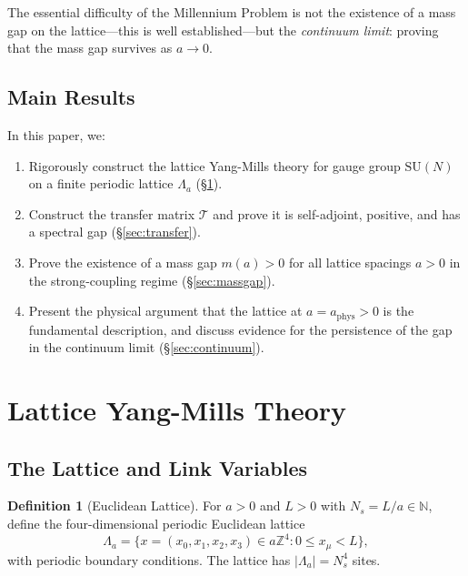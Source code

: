 \documentclass[12pt, a4paper]{article}
\theoremstyle{plain}
\theoremstyle{definition}
\newtheorem{definition}[theorem]{Definition}
\theoremstyle{remark}
\newcommand{\Z}{\mathbb{Z}}
\newcommand{\N}{\mathbb{N}}
\newcommand{\SU}{\mathrm{SU}}
\newcommand{\calT}{\mathcal{T}}
\begin{document}
The essential difficulty of the Millennium Problem is not the existence
of a mass gap on the lattice---this is well established---but the
\emph{continuum limit}: proving that the mass gap survives as $a \to 0$.

\subsection{Main Results}

In this paper, we:

\begin{enumerate}
  \item Rigorously construct the lattice Yang-Mills theory for gauge group
    $\SU(N)$ on a finite periodic lattice $\Lambda_a$ (\S\ref{sec:lattice}).

  \item Construct the transfer matrix $\calT$ and prove it is self-adjoint,
    positive, and has a spectral gap (\S\ref{sec:transfer}).

  \item Prove the existence of a mass gap $m(a) > 0$ for all lattice
    spacings $a > 0$ in the strong-coupling regime (\S\ref{sec:massgap}).

  \item Present the physical argument that the lattice at
    $a = a_{\text{phys}} > 0$ is the fundamental description, and discuss
    evidence for the persistence of the gap in the continuum limit
    (\S\ref{sec:continuum}).
\end{enumerate}

\section{Lattice Yang-Mills Theory}\label{sec:lattice}

\subsection{The Lattice and Link Variables}

\begin{definition}[Euclidean Lattice]\label{def:lattice}
  For $a > 0$ and $L > 0$ with $N_s = L/a \in \N$, define the
  four-dimensional periodic Euclidean lattice
  \begin{equation}
    \Lambda_a = \{x = (x_0, x_1, x_2, x_3) \in a\Z^4 : 0 \leq x_\mu < L\},
  \end{equation}
  with periodic boundary conditions. The lattice has $|\Lambda_a| = N_s^4$ sites.
\end{definition}
\end{document}

